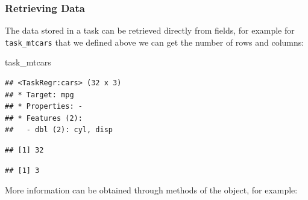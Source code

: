\documentclass[
]{scrbook}
\newenvironment{Shaded}{\begin{snugshade}}{\end{snugshade}}
\newcommand{\FunctionTok}[1]{\textcolor[rgb]{0.00,0.00,0.00}{#1}}
\newcommand{\NormalTok}[1]{#1}
\newcommand{\SpecialCharTok}[1]{\textcolor[rgb]{0.00,0.00,0.00}{#1}}
\renewenvironment{Shaded} {\begin{snugshade}\small} {\end{snugshade}}
\begin{document}
\hypertarget{tasks-retrieving}{%
\subsubsection{Retrieving Data}\label{tasks-retrieving}}

The data stored in a task can be retrieved directly from fields, for example for \texttt{task\_mtcars} that we defined above we can get the number of rows and columns:

\begin{Shaded}
\begin{Highlighting}[]
\NormalTok{task\_mtcars}
\end{Highlighting}
\end{Shaded}

\begin{verbatim}
## <TaskRegr:cars> (32 x 3)
## * Target: mpg
## * Properties: -
## * Features (2):
##   - dbl (2): cyl, disp
\end{verbatim}

\begin{Shaded}
\end{Shaded}

\begin{verbatim}
## [1] 32
\end{verbatim}

\begin{Shaded}
\end{Shaded}

\begin{verbatim}
## [1] 3
\end{verbatim}

More information can be obtained through methods of the object, for example:

\begin{Shaded}
\end{Shaded}
\end{document}
